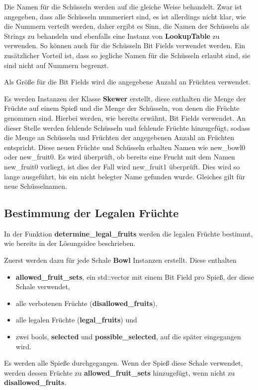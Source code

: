 \documentclass[a4paper,10pt,ngerman]{scrartcl}
\begin{document}
Die Namen für die Schüsseln werden auf die gleiche Weise behandelt.
Zwar ist angegeben, dass alle Schüsseln nummeriert sind, es ist allerdings nicht klar, wie die Nummern verteilt werden, daher ergibt es Sinn, die Namen der Schüsseln als Strings zu behandeln und ebenfalls eine Instanz von \textbf{LookupTable} zu verwenden.
So können auch für die Schüsseln Bit Fields verwendet werden.
Ein zusätzlicher Vorteil ist, dass so jegliche Namen für die Schüsseln erlaubt sind, sie sind nicht auf Nummern begrenzt.

Als Größe für die Bit Fields wird die angegebene Anzahl an Früchten verwendet.

\medskip
Es werden Instanzen der Klasse \textbf{Skewer} erstellt, diese enthalten die Menge der Früchte auf einem Spieß und die Menge der Schüsseln, von denen die Früchte genommen sind.
Hierbei werden, wie bereits erwähnt, Bit Fields verwendet.
An dieser Stelle werden fehlende Schüsseln und fehlende Früchte hinzugefügt, sodass die Menge an Schüsseln und Früchten der angegebenen Anzahl an Früchten entspricht.
Diese neuen Früchte und Schüsseln erhalten Namen wie \glqq new\_bowl0\grqq{} oder \glqq new\_fruit0\grqq{}.
Es wird überprüft, ob bereits eine Frucht mit dem Namen \glqq new\_fruit0\grqq{} vorliegt, ist dies der Fall wird \glqq new\_fruit1\grqq{} überprüft.
Dies wird so lange ausgeführt, bis ein nicht belegter Name gefunden wurde.
Gleiches gilt für neue Schüsselnamen.

\subsection{Bestimmung der Legalen Früchte}
In der Funktion \textbf{determine\_legal\_fruits} werden die legalen Früchte bestimmt, wie bereits in der Lösungsidee beschrieben.

Zuerst werden dazu für jede Schale \textbf{Bowl} Instanzen erstellt.
Diese enthalten
\begin{itemize}
    \item \textbf{allowed\_fruit\_sets}, ein std::vector mit einem Bit Field pro Spieß, der diese Schale verwendet,
    \item alle verbotenen Früchte (\textbf{disallowed\_fruits}),
    \item alle legalen Früchte (\textbf{legal\_fruits}) und
    \item zwei bools, \textbf{selected} und \textbf{possible\_selected}, auf die später eingegangen wird.
\end{itemize}
Es werden alle Spieße durchgegangen.
Wenn der Spieß diese Schale verwendet, werden dessen Früchte zu \textbf{allowed\_fruit\_sets} hinzugefügt, wenn nicht zu \textbf{disallowed\_fruits}.
\end{document}
